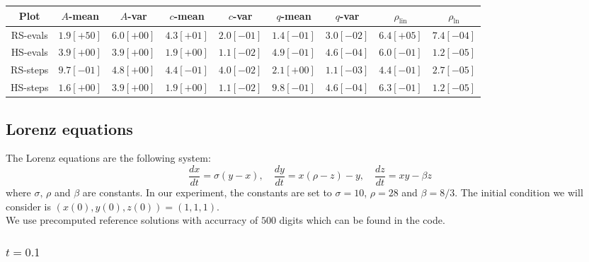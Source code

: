 \begin{table}[H]
    \centering
    \small
    \begin{tabular}{c||c|c|c|c|c|c|c|c}
Plot & \(A\)-mean & \(A\)-var & \(c\)-mean & \(c\)-var & \(q\)-mean & \(q\)-var & \(\rho_{\operatorname{lin}}\) & \(\rho_{\ln}\)\\\hline
RS-evals & \(1.9[+50]\) & \(6.0[+00]\) & \(4.3[+01]\) & \(2.0[-01]\) & \(1.4[-01]\) & \(3.0[-02]\) & \(6.4[+05]\) & \(7.4[-04]\) \\
HS-evals & \(3.9[+00]\) & \(3.9[+00]\) & \(1.9[+00]\) & \(1.1[-02]\) & \(4.9[-01]\) & \(4.6[-04]\) & \(6.0[-01]\) & \(1.2[-05]\) \\
RS-steps & \(9.7[-01]\) & \(4.8[+00]\) & \(4.4[-01]\) & \(4.0[-02]\) & \(2.1[+00]\) & \(1.1[-03]\) & \(4.4[-01]\) & \(2.7[-05]\) \\
HS-steps & \(1.6[+00]\) & \(3.9[+00]\) & \(1.9[+00]\) & \(1.1[-02]\) & \(9.8[-01]\) & \(4.6[-04]\) & \(6.3[-01]\) & \(1.2[-05]\) \\
    \end{tabular}
    \label{tab:my_label}
\end{table}

\subsection{Lorenz equations}

The Lorenz equations are the following system: 
\[
\frac{dx}{dt} = \sigma (y-x),\quad \frac{dy}{dt} = x(\rho - z) - y,\quad \frac{dz}{dt} = xy - \beta z
\]
where \(\sigma,\,\rho\) and \(\beta\) are constants. In our experiment, the constants are set to \(\sigma = 10\), \(\rho = 28\) and \(\beta = 8/3\). The initial condition we will consider is \((x(0),y(0),z(0)) = (1,1,1)\).\\

We use precomputed reference solutions with accurracy of \(500\) digits which can be found in the code.

\subsubsection{\(t = 0.1\)}

